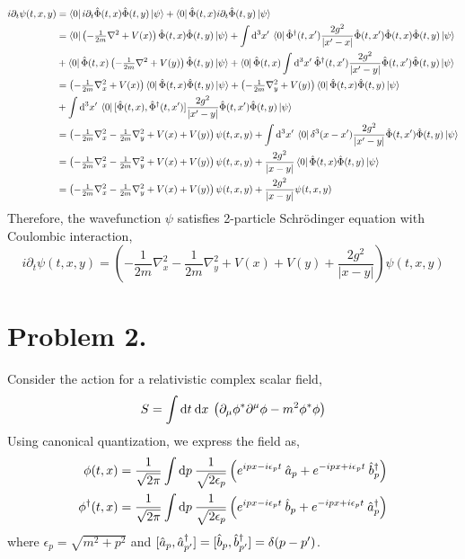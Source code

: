 \documentclass[12pt]{extarticle}
\begin{document}
\begin{align*}
i \partial_t \psi(t, x, y) & = \left< 0 \right| i \partial_t \hat{\Phi}(t, x) \hat{\Phi}(t, y) \left| \psi \right> + \left< 0 \right| \hat{\Phi}(t, x)  i \partial_t \hat{\Phi}(t, y) \left| \psi \right>
\\
& = \left< 0 \right| \left( -\tfrac{1}{2m} \nabla^2 + V(x)\right) \hat{\Phi}(t, x) \hat{\Phi}(t, y) \left| \psi \right> + \int \mathrm{d}^3x' \:  \left< 0 \right| \hat{\Phi}^\dagger(t, x') \frac{2 g^2}{|x' - x|} \hat{\Phi}(t, x') \hat{\Phi}(t, x) \hat{\Phi}(t, y) \left| \psi \right>
\\
& + \left< 0 \right| \hat{\Phi}(t, x) \left( -\tfrac{1}{2m} \nabla^2 + V(y)\right) \hat{\Phi}(t, y) \left| \psi \right> + \left< 0 \right| \hat{\Phi}(t, x)  \int \mathrm{d}^3x' \:  \hat{\Phi}^\dagger(t, x') \frac{2 g^2}{|x' - y|} \hat{\Phi}(t, x') \hat{\Phi}(t, y) \left| \psi \right> 
\\
& = \left( -\tfrac{1}{2m} \nabla_x^2 + V(x)\right) \left< 0 \right| \hat{\Phi}(t, x) \hat{\Phi}(t, y) \left| \psi \right> + \left( -\tfrac{1}{2m} \nabla_y^2 + V(y)\right) \left< 0 \right| \hat{\Phi}(t, x) \hat{\Phi}(t, y) \left| \psi \right>
\\
& + \int \mathrm{d}^3x' \:  \left< 0 \right| [\hat{\Phi}(t, x), \hat{\Phi}^\dagger(t, x')] \frac{2 g^2}{|x' - y|} \hat{\Phi}(t, x') \hat{\Phi}(t, y) \left| \psi \right>
\\
& = \left( -\tfrac{1}{2m} \nabla_x^2 -\tfrac{1}{2m} \nabla_y^2 + V(x) + V(y)\right) \psi(t, x, y) + \int \mathrm{d}^3x' \:  \left< 0 \right| \delta^3(x - x') \frac{2 g^2}{|x' - y|} \hat{\Phi}(t, x') \hat{\Phi}(t, y) \left| \psi \right>
\\
& = \left( -\tfrac{1}{2m} \nabla_x^2 -\tfrac{1}{2m} \nabla_y^2 + V(x) + V(y)\right) \psi(t, x, y) + \frac{2 g^2}{|x - y|}  \left< 0 \right| \hat{\Phi}(t, x) \hat{\Phi}(t, y) \left| \psi \right>
\\
& = \left( -\tfrac{1}{2m} \nabla_x^2 -\tfrac{1}{2m} \nabla_y^2 + V(x) + V(y)\right) \psi(t, x, y) + \frac{2 g^2}{|x - y|}  \psi(t, x, y)
\end{align*}
Therefore, the wavefunction $\psi$ satisfies 2-particle Schrödinger equation with Coulombic interaction,
\[ i \partial_t \psi(t, x, y) = \left( -\frac{1}{2m} \nabla_x^2 -\frac{1}{2m} \nabla_y^2 + V(x) + V(y) + \frac{2 g^2}{|x - y|} \right) \psi(t, x, y) \]
\section*{Problem 2.}
Consider the action for a relativistic complex scalar field,
\[ S = \int \mathrm{d}t \: \mathrm{d}x \: \left( \partial_\mu \phi^* \partial^\mu \phi - m^2 \phi^* \phi \right) \]
Using canonical quantization, we express the field as,
\begin{align*}
\phi(t, x) & = \frac{1}{\sqrt{2 \pi}} \int \mathrm{d}p \: \frac{1}{\sqrt{2 \epsilon_p}} \left( e^{i p x - i \epsilon_p t} \: \hat{a}_p + e^{- i p x + i \epsilon_p t} \: \hat{b}^\dagger_p \right) 
\\
\phi^\dagger(t, x) & = \frac{1}{\sqrt{2 \pi}} \int \mathrm{d}p \: \frac{1}{\sqrt{2 \epsilon_p}} \left( e^{i p x - i \epsilon_p t} \: \hat{b}_p + e^{- i p x + i \epsilon_p t} \: \hat{a}^\dagger_p \right) 
\end{align*}
where $\epsilon_p = \sqrt{m^2 + p^2}$ and $[\hat{a}_p, \hat{a}^\dagger_{p'}] = [\hat{b}_p, \hat{b}^\dagger_{p'}] = \delta(p - p')$. 
\end{document}
